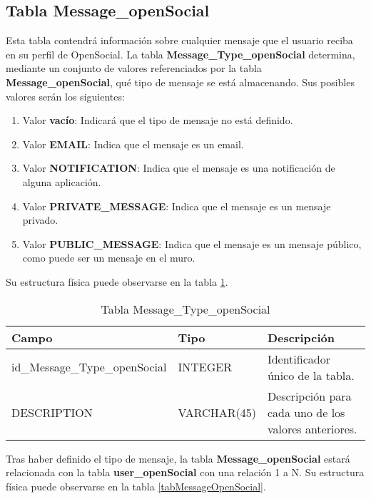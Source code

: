 \subsection{Tabla Message\_openSocial}
Esta tabla contendrá información sobre cualquier mensaje que el usuario reciba en su perfil de OpenSocial. La tabla \textbf{Message\_Type\_openSocial} determina, mediante un conjunto de valores referenciados por la tabla \textbf{Message\_openSocial}, qué tipo de mensaje se está almacenando. Sus posibles valores serán los siguientes:
\begin{enumerate}
\item Valor \textbf{vacío}: Indicará que el tipo de mensaje no está definido.
\item Valor \textbf{EMAIL}: Indica que el mensaje es un email.
\item Valor \textbf{NOTIFICATION}: Indica que el mensaje es una notificación de alguna aplicación.
\item Valor \textbf{PRIVATE\_MESSAGE}: Indica que el mensaje es un mensaje privado.
\item Valor \textbf{PUBLIC\_MESSAGE}: Indica que el mensaje es un mensaje público, como puede ser un mensaje en el muro.
\end{enumerate}
\bigskip
\par
Su estructura física puede observarse en la tabla \ref{tabMessageTypeOpenSocial}.
\begin{table}[h]
\begin{center}
\begin{tabular}{| l | l | p{60mm} |}\hline
\textbf{Campo}&\textbf{Tipo}&\textbf{Descripción} \\ \hline
id\_Message\_Type\_openSocial & INTEGER & Identificador único de la tabla. \\ \hline
DESCRIPTION & VARCHAR(45) & Descripción para cada uno de los valores anteriores. \\ \hline
\end{tabular}
\end{center}
\caption{Tabla Message\_Type\_openSocial} \label{tabMessageTypeOpenSocial}
\end{table}
\bigskip
\par
Tras haber definido el tipo de mensaje, la tabla \textbf{Message\_openSocial} estará relacionada con la tabla \textbf{user\_openSocial} con una relación 1 a N. Su estructura física puede observarse en la tabla \ref{tabMessageOpenSocial}.
\bigskip
\par
